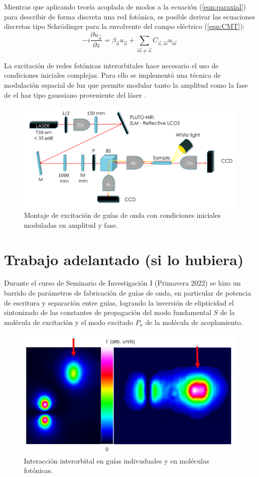 \documentclass{article}
\begin{document}
Mientras que aplicando teoría acoplada de modos a la ecuación (\ref{eqn:paraxial}) para describir de forma discreta una red fotónica, es posible derivar las ecuaciones discretas tipo Schrödinger para la envolvente del campo eléctrico (\ref{eqn:CMT}):
\begin{equation}
	-i\frac{\partial u_{\vec{n}} }{\partial z} = \beta_{\vec{n}}u_{\vec{n}} + \sum_{\vec{m}\neq\vec{n}} C_{\vec{n},\vec{m}}u_{\vec{m}} \label{eqn:CMT}
\end{equation}

La excitación de redes fotónicas interorbitales hace necesario el uso de condiciones iniciales complejas. Para ello se implementó una técnica de modulación espacial de luz que permite modular tanto la amplitud como la fase de el haz tipo gaussiano proveniente del láser \cite{slm}.

\begin{figure}[H]
	\centering
	\includegraphics[width=0.9\linewidth]{./media/montaje.png}
	\caption{Montaje de excitación de guías de onda con condiciones iniciales moduladas en amplitud y fase.\label{fig:SLM}}
\end{figure}

\section{Trabajo adelantado (si lo hubiera)}

Durante el curso de Seminario de Investigación I (Primavera 2022) se hizo un barrido de parámetros de fabricación de guías de onda, en particular de potencia de escritura y separación entre guías, logrando la inversión de elipticidad el sintonizado de las constantes de propagación del modo fundamental $S$ de la molécula de excitación y el modo excitado $P_x$ de la molécula de acoplamiento.


\begin{figure}[H]
	\centering
	\includegraphics[width=0.5\linewidth]{./media/SPinteraction.jpg}
	\caption{Interacción interorbital en guías indivuduales y en moléculas fotónicas.}
\end{figure}
\end{document}
